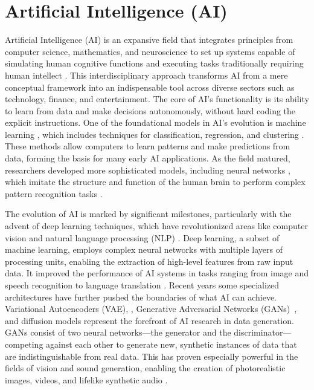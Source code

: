 \documentclass[11pt,a4paper,oneside]{report}
\begin{document}
\section{Artificial Intelligence (AI)}
Artificial Intelligence (AI) is an expansive field that integrates principles from computer science, mathematics, and neuroscience to set up systems capable of simulating human cognitive functions and executing tasks traditionally requiring human intellect \cite{russell2010artificial}. 
This interdisciplinary approach transforms AI from a mere conceptual framework into an indispensable tool across diverse sectors such as technology, finance, and entertainment. 
The core of AI's functionality is its ability to learn from data and make decisions autonomously, without hard coding the explicit instructions. 
One of the foundational models in AI's evolution is machine learning \cite{jordan2015machine}, which includes techniques for classification, regression, and clustering \cite{huang2022large}. 
These methods allow computers to learn patterns and make predictions from data, forming the basis for many early AI applications. 
As the field matured, researchers developed more sophisticated models, including neural networks \cite{abiodun2018state}, which imitate the structure and function of the human brain to perform complex pattern recognition tasks \cite{schmidhuber2015deep}.

The evolution of AI is marked by significant milestones, particularly with the advent of deep learning \cite{lecun2015deep} techniques, which have revolutionized areas like computer vision \cite{voulodimos2018deep} and natural language processing (NLP) \cite{chowdhary2020natural}. 
Deep learning, a subset of machine learning, employs complex neural networks with multiple layers of processing units, enabling the extraction of high-level features from raw input data. 
It improved the performance of AI systems in tasks ranging from image and speech recognition to language translation \cite{goodfellow2016deep}.
Recent years some specialized architectures have further pushed the boundaries of what AI can achieve. 
Variational Autoencoders (VAE), \cite{rezende2014stochastic, kingma2013auto}, Generative Adversarial Networks (GANs)~\cite{goodfellow2014generative, vondrick2016generating, tulyakov2018mocogan, clark2019adversarial, brooks2022generating}, and diffusion models \cite{rombach2022high, ho2022imagen, blattmann2023align, gupta2023photorealistic} represent the forefront of AI research in data generation. 
GANs consist of two neural networks—the generator and the discriminator—competing against each other to generate new, synthetic instances of data that are indistinguishable from real data. 
This has proven especially powerful in the fields of vision and sound generation, enabling the creation of photorealistic images, videos, and lifelike synthetic audio \cite{granot2022drop}.
\end{document}
